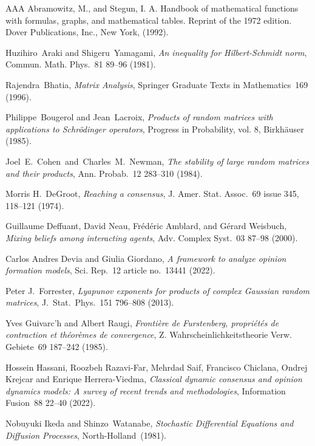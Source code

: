 \documentclass[12pt]{article}
\newcommand{\1}{\mathbf{1}}
\begin{document}
\begin{thebibliography}{AAA}
 Abramowitz, M., and Stegun, I. A.  Handbook of mathematical functions with formulas, graphs, and mathematical tables. Reprint of the 1972 edition. Dover Publications, Inc., New York, (1992).

  Huzihiro~Araki and Shigeru~Yamagami, \emph{An inequality for Hilbert-Schmidt norm}, Commun. Math. Phys.~{81} 89--96 (1981).

 Rajendra~Bhatia, \emph{Matrix Analysis}, Springer Graduate Texts in Mathematics~{169} (1996).

 Philippe~Bougerol and Jean~Lacroix, \emph{Products of random matrices with applications to Schr\"odinger operators}, Progress in Probability, vol. 8, Birkh\"auser (1985).

 Joel~E.~Cohen~and~Charles~M.~Newman, \emph{The stability of large random matrices and their products}, Ann. Probab.~{12} 283--310 (1984).

 Morris H.~DeGroot, \emph{Reaching a consensus}, J. Amer. Stat. Assoc.~{69} issue 345,  118--121 (1974).

 Guillaume Deffuant, David Neau, Fr\'{e}d\'{e}ric Amblard, and G\'{e}rard Weisbuch, \emph{Mixing beliefs among interacting agents}, Adv.  Complex Syst.~{03} 87--98 (2000). 

 Carlos Andres Devia and Giulia Giordano, \emph{A framework to analyze opinion formation models}, Sci. Rep.~{12} article no.~13441 (2022).

 Peter J.~Forrester, \emph{Lyapunov exponents for products of complex Gaussian random matrices}, J.~Stat.~Phys.~{151} 796--808 (2013).

 Yves Guivarc'h and Albert Raugi, \emph{Fronti\`ere de Furstenberg, propri\'et\'es de contraction et th\'eor\`emes de convergence}, Z. Wahrscheinlichkeitstheorie  Verw. Gebiete~{69} 187--242 (1985).

 Hossein Hassani, Roozbeh Razavi-Far, Mehrdad Saif, Francisco Chiclana, Ondrej Krejcar and Enrique Herrera-Viedma, \emph{Classical dynamic consensus and opinion dynamics models: A survey of recent trends and methodologies}, Information Fusion~{88}  22--40 (2022).

 Nobuyuki Ikeda and Shinzo~Watanabe, \emph{Stochastic Differential Equations and Diffusion Processes}, North-Holland~(1981).


\end{thebibliography}
\end{document}

